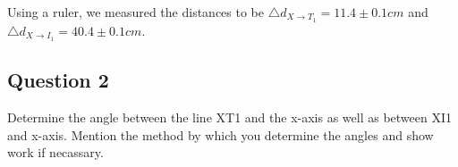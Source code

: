 \documentclass[12pt]{article}
\begin{document}
\begin{center}
\begin{figure}[H]
\centering
{}
\end{figure}
\end{center}

Using a ruler, we measured the distances to be $\triangle{d}_{X\rightarrow{}T_{1}} = 11.4\pm0.1cm$ and $\triangle{d}_{X\rightarrow{}I_{1}} = 40.4\pm0.1cm$.

\pagebreak

\subsection{Question 2}
Determine the angle between the line XT1 and the x-axis as well as between XI1 and x-axis. Mention the method by which you determine the angles and show work if necassary.
\end{document}
